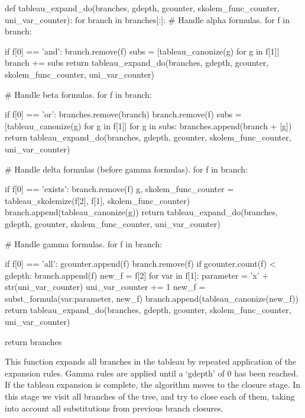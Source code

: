 \documentclass[a4paper,notitlepage]{scrartcl}
\begin{document}
\begin{code}
def tableau_expand_do(branches, gdepth, gcounter, skolem_func_counter, uni_var_counter):
    for branch in branches[:]:
        # Handle alpha formulas.
        for f in branch:

            if f[0] == 'and':
                branch.remove(f)
                subs = [tableau_canonize(g) for g in f[1]]
                branch += subs
                return tableau_expand_do(branches, gdepth, gcounter, skolem_func_counter, uni_var_counter)

        # Handle beta formulas.
        for f in branch:

            if f[0] == 'or':
                branches.remove(branch)
                branch.remove(f)
                subs = [tableau_canonize(g) for g in f[1]]
                for g in subs:
                    branches.append(branch + [g])
                return tableau_expand_do(branches, gdepth, gcounter, skolem_func_counter, uni_var_counter)

        # Handle delta formulas (before gamma formulas).
        for f in branch:

            if f[0] == 'exists':
                branch.remove(f)
                g, skolem_func_counter = tableau_skolemize(f[2], f[1],
                    skolem_func_counter)
                branch.append(tableau_canonize(g))
                return tableau_expand_do(branches, gdepth, gcounter, skolem_func_counter, uni_var_counter)

        # Handle gamma formulas.
        for f in branch:

            if f[0] == 'all':
                gcounter.append(f)
                branch.remove(f)
                if gcounter.count(f) < gdepth:
                    branch.append(f)
                new_f = f[2]
                for var in f[1]:
                    parameter =  'x' + str(uni_var_counter)
                    uni_var_counter += 1
                    new_f = subst_formula({var:parameter}, new_f)
                branch.append(tableau_canonize(new_f))
                return tableau_expand_do(branches, gdepth, gcounter, skolem_func_counter, uni_var_counter)

    return branches
\end{code}

This function expands all branches in the tableau by repeated application of
the expansion rules. Gamma rules are applied until a `gdepth' of 0 has been
reached. If the tableau expansion is complete, the algorithm moves to the
closure stage. In this stage we visit all branches of the tree, and try to
close each of them, taking into account all substitutions from previous branch
closures.
\end{document}
